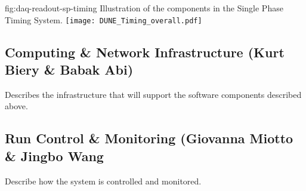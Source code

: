\begin{dunefigure}{fig:daq-readout-sp-timing}
  {Illustration of the components in the Single Phase Timing System. }
\texttt{[image: DUNE\_Timing\_overall.pdf]}
\end{dunefigure}



\subsection{Computing \& Network Infrastructure (Kurt Biery \& Babak Abi)}
\label{sec:fdsp-daq-infra}

Describes the infrastructure that will support the software components described above.

\subsection{Run Control \& Monitoring (Giovanna Miotto \& Jingbo Wang}
\label{sec:fdsp-daq-tcm}

Describe how the system is controlled and monitored.

